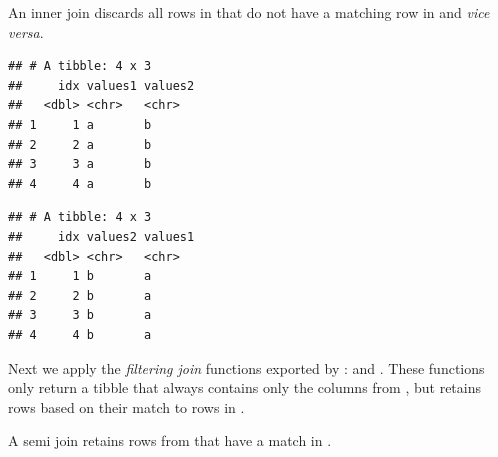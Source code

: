 \documentclass[krantz2]{krantz}\usepackage{knitr}
\begin{document}
An inner join discards all rows in  that do not have a matching row in  and \emph{vice versa}.

\begin{knitrout}\footnotesize
{}\color{fgcolor}\begin{kframe}
\begin{alltt}
\hlstd{(}   
\end{alltt}


{\ttfamily\noindent\itshape{}}\begin{verbatim}
## # A tibble: 4 x 3
##     idx values1 values2
##   <dbl> <chr>   <chr>  
## 1     1 a       b      
## 2     2 a       b      
## 3     3 a       b      
## 4     4 a       b
\end{verbatim}
\end{kframe}
\end{knitrout}

\begin{knitrout}\footnotesize
{}\color{fgcolor}\begin{kframe}
\begin{alltt}
\hlstd{(}   
\end{alltt}


{\ttfamily\noindent\itshape{}}\begin{verbatim}
## # A tibble: 4 x 3
##     idx values2 values1
##   <dbl> <chr>   <chr>  
## 1     1 b       a      
## 2     2 b       a      
## 3     3 b       a      
## 4     4 b       a
\end{verbatim}
\end{kframe}
\end{knitrout}

Next we apply the \emph{filtering join} functions exported by :  and . These functions only return a tibble that always contains only the columns from , but retains rows based on their match to rows in .

A semi join retains rows from  that have a match in .
\end{document}
